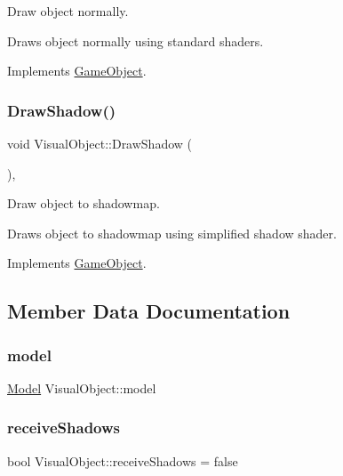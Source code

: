 Draw object normally. 

Draws object normally using standard shaders. 

Implements \mbox{\hyperlink{class_game_object_a29a665f46fda87982825bc5c0ca6a888}{Game\+Object}}.

\mbox{\label{class_visual_object_a88e778dc97ad93cefd5193d6899d6c82}} 
\subsubsection{\texorpdfstring{DrawShadow()}{DrawShadow()}}
{\footnotesize\ttfamily void Visual\+Object\+::\+Draw\+Shadow (\begin{DoxyParamCaption}{ }\end{DoxyParamCaption})\hspace{0.3cm}{\ttfamily [override]}, {\ttfamily [virtual]}}



Draw object to shadowmap. 

Draws object to shadowmap using simplified shadow shader. 

Implements \mbox{\hyperlink{class_game_object_a78bf45c8ef3805247435583556087788}{Game\+Object}}.



\subsection{Member Data Documentation}
\mbox{\label{class_visual_object_a325fec77ff1a5441f1ff4ffa98e508c8}} 
\subsubsection{\texorpdfstring{model}{model}}
{\footnotesize\ttfamily \mbox{\hyperlink{class_model}{Model}} Visual\+Object\+::model}

\mbox{\label{class_visual_object_af54b3c823b3ca24736faeedc88ef90f3}} 
\subsubsection{\texorpdfstring{receiveShadows}{receiveShadows}}
{\footnotesize\ttfamily bool Visual\+Object\+::receive\+Shadows = false}

